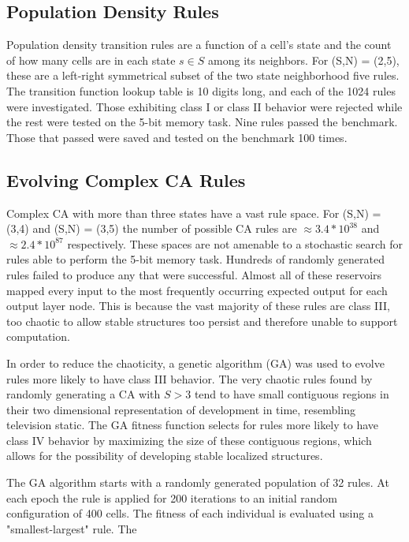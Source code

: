 \documentclass{article}
\begin{document}
\begin{multicols}{2}
\subsection{Population Density Rules}
Population density transition rules are a function of a cell's state and the 
count of how many cells are in each state $s \in S$ among its neighbors. For 
(S,N) = (2,5), these are a left-right symmetrical subset of the two state 
neighborhood five rules. The transition function lookup table is 10 digits 
long, and each of the 1024 rules were investigated. Those exhibiting class I or 
class II behavior were rejected while the rest were tested on the 5-bit memory 
task. Nine rules passed the benchmark. Those that passed were saved and tested 
on the benchmark 100 times.

  \subsection{Evolving Complex CA Rules}
Complex CA with more than three states have a vast rule space. For (S,N) = 
(3,4) and (S,N) = (3,5) the number of possible CA rules are $\approx 3.4 * 
10^38$ and $\approx 2.4 * 10^87$ respectively. These spaces are not amenable to 
a stochastic search for rules able to perform the 5-bit memory task.  Hundreds 
of randomly generated rules failed to produce any that were successful. Almost 
all of these reservoirs mapped every input to the most frequently occurring 
expected output for each output layer node. This is because the vast majority 
of these rules are class III, too chaotic to allow stable structures too 
persist and therefore unable to support computation.\par
In order to reduce the chaoticity, a genetic algorithm (GA) was used to evolve 
rules more likely to have class III behavior. The very chaotic rules found by 
randomly generating a CA with $S > 3$ tend to have small contiguous regions in 
their two dimensional representation of development in time, resembling 
television static.  The GA fitness function selects for rules more likely to 
have class IV behavior by maximizing the size of these contiguous regions, 
     which allows for the possibility of developing stable localized 
     structures. \par The GA algorithm starts with a randomly generated 
     population of 32 rules. At each epoch the rule is applied for 200 
     iterations to an initial random configuration of 400 cells.  The fitness 
     of each individual is evaluated using a "smallest-largest" rule.  The 

\end{multicols}
\end{document}
